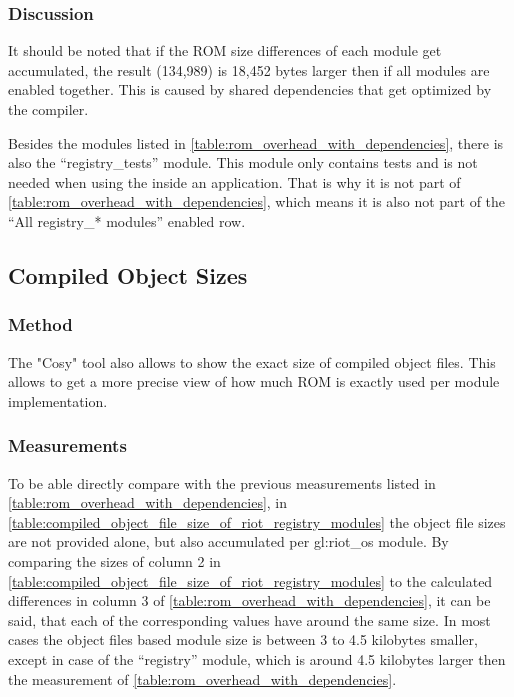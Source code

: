 \subsubsection{Discussion}

It should be noted that if the ROM size differences of each  module get accumulated, the result (134,989) is 18,452 bytes larger then if all  modules are enabled together. This is caused by shared dependencies that get optimized by the compiler.

Besides the  modules listed in \autoref{table:rom_overhead_with_dependencies}, there is also the ``registry\_tests'' module.
This module only contains tests and is not needed when using the  inside an application.
That is why it is not part of \autoref{table:rom_overhead_with_dependencies}, which means it is also not part of the ``All registry\_* modules'' enabled row.

\subsection{Compiled Object Sizes}

\subsubsection{Method}

The "Cosy" tool also allows to show the exact size of compiled object files.
This allows to get a more precise view of how much ROM is exactly used per module implementation.

\subsubsection{Measurements}

To be able directly compare with the previous measurements listed in \autoref{table:rom_overhead_with_dependencies}, in \autoref{table:compiled_object_file_size_of_riot_registry_modules} the object file sizes are not provided alone, but also accumulated per \gls{gl:riot_os} module.
By comparing the sizes of column 2 in \autoref{table:compiled_object_file_size_of_riot_registry_modules} to the calculated differences in column 3 of \autoref{table:rom_overhead_with_dependencies}, it can be said, that each of the corresponding values have around the same size.
In most cases the object files based module size is between 3 to 4.5 kilobytes smaller, except in case of the ``registry'' module, which is around 4.5 kilobytes larger then the measurement of \autoref{table:rom_overhead_with_dependencies}.

